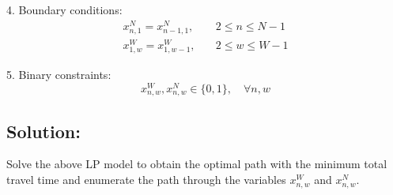 \documentclass{article}
\begin{document}
4. Boundary conditions:
   \begin{align}
   x_{n,1}^N = x_{n-1,1}^N, & \quad 2 \leq n \leq N-1 \\
   x_{1,w}^W = x_{1,w-1}^W, & \quad 2 \leq w \leq W-1
   \end{align}

5. Binary constraints:
   \begin{equation}
   x_{n,w}^W, x_{n,w}^N \in \{0, 1\}, \quad \forall n, w
   \end{equation}

\subsection*{Solution:}
Solve the above LP model to obtain the optimal path with the minimum total travel time and enumerate the path through the variables \(x_{n,w}^W\) and \(x_{n,w}^N\).
\end{document}
